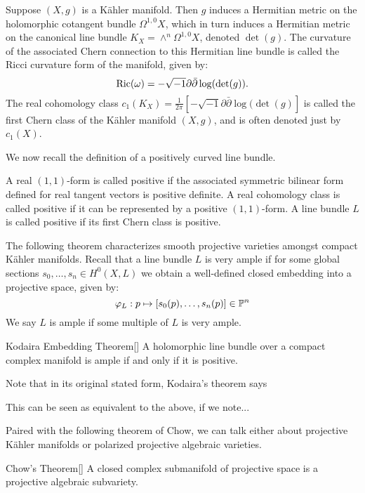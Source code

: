 \begin{example}
Suppose \((X,g)\) is a K\"ahler manifold. Then \(g\) induces a Hermitian metric on the holomorphic cotangent bundle \(\Omega^{1,0} X\), which in turn induces a Hermitian metric on the canonical line bundle \(K_X = \wedge^{n} \Omega^{1,0} X\), denoted \(\det(g)\). The curvature of the associated Chern connection to this Hermitian line bundle is called the Ricci curvature form of the manifold, given by:
\[
\mathop{\rm Ric}\nolimits(\omega) = - \sqrt{-1} \partial \bar{\partial} \log( \det(g) ).
\]
The real cohomology class \(c_1(K_X) = \frac{1}{2 \pi} [  - \sqrt{-1} \partial \bar{\partial} \log( \det(g) ]  \) is called the first Chern class of the K\"ahler manifold \((X,g)\), and is often denoted just by \(c_1(X)\).
\end{example}
We now recall the definition of a positively curved line bundle.
\begin{definition}
A real \((1,1)\)-form is called positive if the associated symmetric bilinear form defined for real tangent vectors is positive definite. A real cohomology class is called positive if it can be represented by a positive \((1,1)\)-form. A line bundle \(L\) is called positive if its first Chern class is positive.
\end{definition}
The following theorem characterizes smooth projective varieties amongst compact K\"ahler manifolds. Recall that a line bundle \(L\) is very ample if for some global sections \(s_0,\dots,s_n \in H^0(X,L)\) we obtain a well-defined closed embedding into a projective space, given by:
\[
\varphi_L: p \mapsto [s_0(p),\dots,s_n(p)] \in \mathbb{P}^n
\]
We say \(L\) is ample if some multiple of \(L\) is very ample.
\begin{namedthm}{Kodaira Embedding Theorem}[\cite{kodaira1954kahler}]
A holomorphic line bundle over a compact complex manifold is ample if and only if it is positive.
\end{namedthm}
\begin{remark}
Note that in its original stated form, Kodaira's theorem says

This can be seen as equivalent to the above, if we note...
\end{remark}

Paired with the following theorem of Chow, we can talk either about projective K\"ahler manifolds or polarized projective algebraic varieties.
\begin{namedthm}{Chow's Theorem}[\cite{chow1949compact}]
A closed complex submanifold of projective space is a projective algebraic subvariety.
\end{namedthm}

